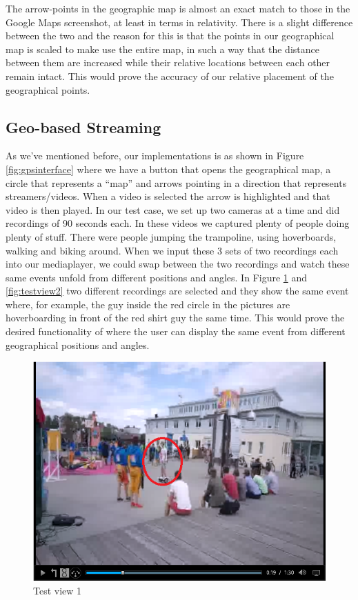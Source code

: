\documentclass[9pt,a4paper]{acmproc}
\begin{document}
The arrow-points in the geographic map is almost an exact match to those in the Google Maps screenshot, at least in terms in relativity. There is a slight difference between the two and the reason for this is that the points in our geographical map is scaled to make use the entire map, in such a way that the distance between them are increased while their relative locations between each other remain intact. This would prove the accuracy of our relative placement of the geographical points.


\subsection{Geo-based Streaming}
As we’ve mentioned before, our implementations is as shown in Figure \ref{fig:gpsinterface} where we have a button that opens the geographical map, a circle that represents a “map” and arrows pointing in a direction that represents streamers/videos. When a video is selected the arrow is highlighted and that video is then played. In our test case, we set up two cameras at a time and did recordings of 90 seconds each. In these videos we captured plenty of people doing plenty of stuff. There were people jumping the trampoline, using hoverboards, walking and biking around. When we input these 3 sets of two recordings each into our mediaplayer, we could swap between the two recordings and watch these same events unfold from different positions and angles. In Figure \ref{fig:testview1} and \ref{fig:testview2} two different recordings are selected and they show the same event where, for example, the guy inside the red circle in the pictures are hoverboarding in front of the red shirt guy the same time. This would prove the desired functionality of where the user can display the same event from different geographical positions and angles.

\begin{figure}[ht!]
\begin{center}
	\includegraphics[scale=0.5]{Hoverboard_1.png}
	\caption{Test view 1}
	\label{fig:testview1}
\end{center}
\end{figure}
\end{document}
